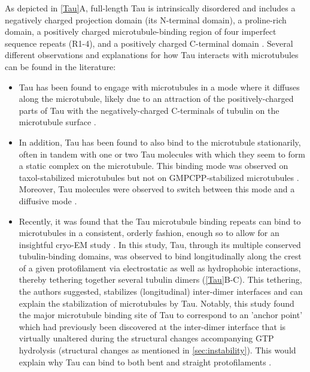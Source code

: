 As depicted in \autoref{Tau}A, full-length Tau is intrinsically disordered and includes a negatively charged projection domain (its N-terminal domain), a proline-rich domain, a positively charged microtubule-binding region of four imperfect sequence repeats (R1-4), and a positively charged C-terminal domain \parencite{Himmler1381}. Several different observations and explanations for how Tau interacts with microtubules can be found in the literature: 
\begin{itemize}
	\item Tau has been found to engage with microtubules in a mode where it diffuses along the microtubule, likely due to an attraction of the positively-charged parts of Tau with the negatively-charged C-terminals of tubulin on the microtubule surface \parencite{Hinrichs2012b}.
	\item In addition, Tau has been found to also bind to the microtubule stationarily, often in tandem with one or two Tau molecules with which they seem to form a static complex on the microtubule. This binding mode was observed on taxol-stabilized microtubules but not on GMPCPP-stabilized microtubules . Moreover, Tau molecules were observed to switch between this mode and a diffusive mode .
	\item Recently, it was found that the Tau microtubule binding repeats can bind to microtubules in a consistent, orderly fashion, enough so to allow for an insightful cryo-EM study \parencite{Kellogg2018}. In this study, Tau, through its multiple conserved tubulin-binding domains, was observed to bind longitudinally along the crest of a given protofilament via electrostatic as well as hydrophobic interactions, thereby tethering together several tubulin dimers (\autoref{Tau}B-C). This tethering, the authors suggested, stabilizes (longitudinal) inter-dimer interfaces and can explain the stabilization of microtubules by Tau. Notably, this study found the major microtubule binding site of Tau to correspond to an 'anchor point' which had previously been discovered  at the inter-dimer interface that is virtually unaltered during the structural changes accompanying GTP hydrolysis (structural changes as mentioned in \autoref{sec:instability}). This would explain why Tau can bind to both bent and straight protofilaments \parencite{Kellogg2018}. 

\end{itemize}
